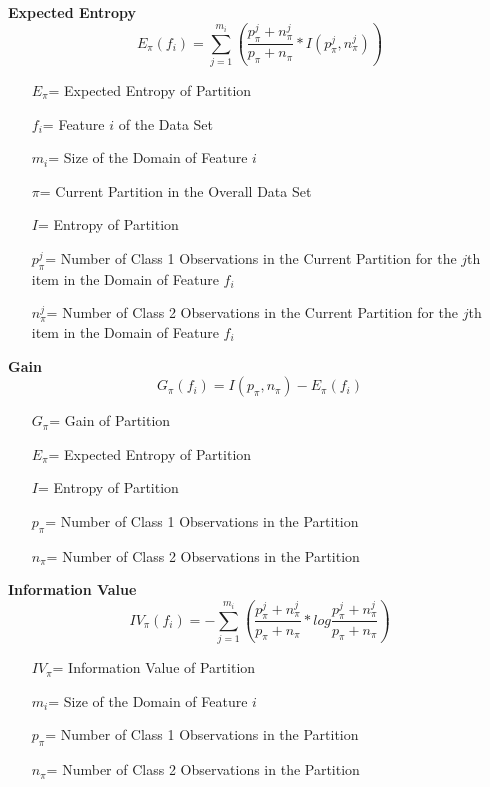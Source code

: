 \documentclass[twoside,11pt]{article}
\begin{document}
\textbf{Expected Entropy}
\begin{equation}
	E_\pi(f_i) = \sum_{j=1}^{m_i}(\frac{p_\pi^j + n_\pi^j}{p_\pi + n_\pi} * I(p_\pi^j, n_\pi^j))
\end{equation}
\begin{itemize}
	\item[$E_\pi$=] Expected Entropy of Partition
	\item[$f_i$=] Feature $i$ of the Data Set
	\item[$m_i$=] Size of the Domain of Feature $i$
	\item[$\pi$=] Current Partition in the Overall Data Set
	\item[$I$=] Entropy of Partition
	\item[$p_\pi^j$=] Number of Class 1 Observations in the Current Partition for the $j$th item in the Domain of Feature $f_i$
	\item[$n_\pi^j$=] Number of Class 2 Observations in the Current Partition for the $j$th item in the Domain of Feature $f_i$
\end{itemize}

\textbf{Gain}
\begin{equation}
	G_\pi(f_i)  = I(p_\pi, n_\pi) - E_\pi(f_i)
\end{equation}
\begin{itemize}
	\item[$G_\pi$=] Gain of Partition
	\item[$E_\pi$=] Expected Entropy of Partition
	\item[$I$=] Entropy of Partition
	\item[$p_\pi$=] Number of Class 1 Observations in the Partition
	\item[$n_\pi$=] Number of Class 2 Observations in the Partition
\end{itemize}

\textbf{Information Value}
\begin{equation}
	IV_\pi(f_i)  = -\sum_{j=1}^{m_i}(\frac{p_\pi^j + n_\pi^j}{p_\pi + n_\pi} * log\frac{p_\pi^j + n_\pi^j}{p_\pi + n_\pi})
\end{equation}
\begin{itemize}
	\item[$IV_\pi$=] Information Value of Partition
	\item[$m_i$=] Size of the Domain of Feature $i$
	\item[$p_\pi$=] Number of Class 1 Observations in the Partition
	\item[$n_\pi$=] Number of Class 2 Observations in the Partition
\end{itemize}
\end{document}
